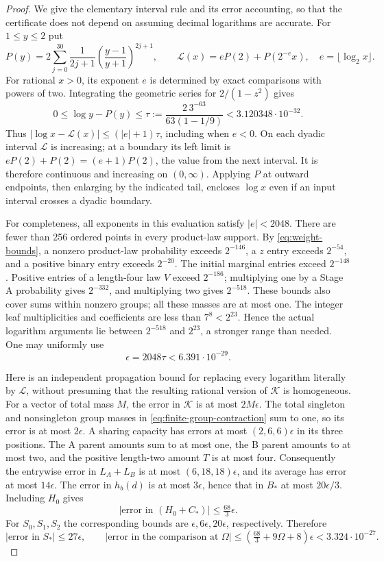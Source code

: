\begin{proof}
We give the elementary interval rule and its error accounting, so that the
certificate does not depend on assuming decimal logarithms are accurate.
For $1\le y\le2$ put
\[
 P(y)=2\sum_{j=0}^{30}\frac{1}{2j+1}
                    \left(\frac{y-1}{y+1}\right)^{2j+1},
 \qquad
 \mathcal L(x)=eP(2)+P(2^{-e}x),\quad e=\lfloor\log_2x\rfloor.
\]
For rational $x>0$, its exponent $e$ is determined by exact comparisons with
powers of two. Integrating the geometric series for $2/(1-z^2)$ gives
\[
 0\le\log y-P(y)\le
 \tau:=\frac{2\,3^{-63}}{63(1-1/9)}<3.120348\cdot10^{-32}.
\]
Thus $|\log x-\mathcal L(x)|\le(|e|+1)\tau$, including when $e<0$.
On each dyadic interval $\mathcal L$ is increasing; at a boundary its left
limit is $eP(2)+P(2)=(e+1)P(2)$, the value from the next interval.
It is therefore continuous and increasing on $(0,\infty)$. Applying $P$
at outward endpoints, then enlarging by the indicated tail, encloses
$\log x$ even if an input interval crosses a dyadic boundary.

For completeness, all exponents in this evaluation satisfy $|e|<2048$.
There are fewer than 256 ordered points in every product-law support.
By \eqref{eq:weight-bounds}, a nonzero product-law probability exceeds
$2^{-146}$, a $z$ entry exceeds $2^{-54}$, and a positive binary entry
exceeds $2^{-20}$. The initial marginal entries exceed $2^{-148}$.
Positive entries of a length-four law $V$ exceed $2^{-186}$; multiplying
one by a Stage A probability gives $2^{-332}$, and multiplying two gives
$2^{-518}$. These bounds also cover sums within nonzero groups; all these
masses are at most one. The integer leaf multiplicities and coefficients
are less than $7^8<2^{23}$. Hence the actual logarithm arguments lie between
$2^{-518}$ and $2^{23}$, a stronger range than needed. One may uniformly use
\begin{equation}\label{eq:log-error}
 \epsilon=2048\tau<6.391\cdot10^{-29}.
\end{equation}

Here is an independent propagation bound for replacing every logarithm
literally by $\mathcal L$, without presuming that the resulting rational
version of $\mathcal K$ is homogeneous. For a vector of total mass $M$, the
error in $\mathcal K$ is at most $2M\epsilon$. The total singleton and
nonsingleton group masses in \eqref{eq:finite-group-contraction} sum to one,
so its error is at most $2\epsilon$. A sharing capacity has errors at most
$(2,6,6)\epsilon$ in its three positions. The A parent amounts sum to at
most one, the B parent amounts to at most two, and the positive length-two
amount $T$ is at most four. Consequently the entrywise error in $L_A+L_B$
is at most $(6,18,18)\epsilon$, and its average has error at most
$14\epsilon$. The error in $h_b(d)$ is at most $3\epsilon$, hence that in
$B_*$ at most $20\epsilon/3$. Including $H_0$ gives
\[
 |\text{error in }(H_0+C_*)|\le\tfrac{68}{3}\epsilon.
\]
For $S_0,S_1,S_2$ the corresponding bounds are
$\epsilon,6\epsilon,20\epsilon$, respectively. Therefore
\[
 |\text{error in }S_*|\le27\epsilon,\qquad
 |\text{error in the comparison at }\Omega|
 \le\left(\tfrac{68}{3}+9\Omega+8\right)\epsilon
 <3.324\cdot10^{-27}.
\]


\end{proof}
